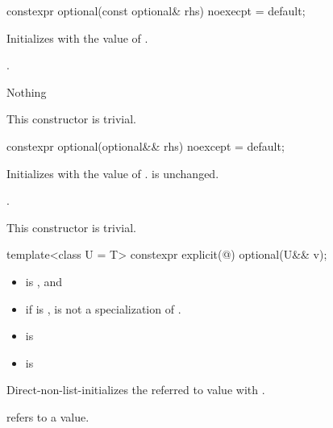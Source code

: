   \begin{itemdecl}
    constexpr optional(const optional& rhs) noexecpt = default;
  \end{itemdecl}

  \begin{itemdescr}
    \pnum
    \effects
    Initializes  with the value of .

    \pnum
    \ensures
    .

    \pnum
    \throws
    Nothing

    \pnum
    \remarks
    This constructor is trivial.

  \end{itemdescr}

  \begin{itemdecl}
    constexpr optional(optional&& rhs) noexcept = default;
  \end{itemdecl}

  \begin{itemdescr}
    \pnum

    \pnum
    \effects
    Initializes  with the value of .
     is unchanged.

    \pnum
    \ensures
    .

    \pnum
    \remarks
    This constructor is trivial.

  \end{itemdescr}



  \begin{itemdecl}
    template<class U = T> constexpr explicit(@\seebelow@) optional(U&& v);
  \end{itemdecl}

  \begin{itemdescr}
    \pnum
    \constraints
    \begin{itemize}
    \item {} is , and
    \item if  is \cv{} ,
       is not a specialization of .
    \end{itemize}

    \pnum
    \mandates
    \begin{itemize}
    \item {} is 
    \item {} is 
    \end{itemize}

    \pnum
    \effects
    Direct-non-list-initializes the referred to value with .

    \pnum
    \ensures
     refers to a value.

  \end{itemdescr}

